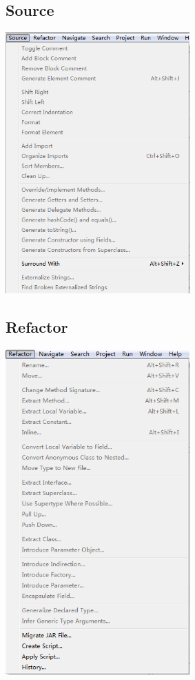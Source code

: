 \documentclass[UTF8]{article}
\begin{document}
        \subsection{Source}
            \begin{center} %
              \includegraphics[width=200pt]{images/menu-source.png} %
            \end{center}

        \subsection{Refactor}
            \begin{center} %
              \includegraphics[width=200pt]{images/menu-refactor.png} %
            \end{center}
\end{document}
